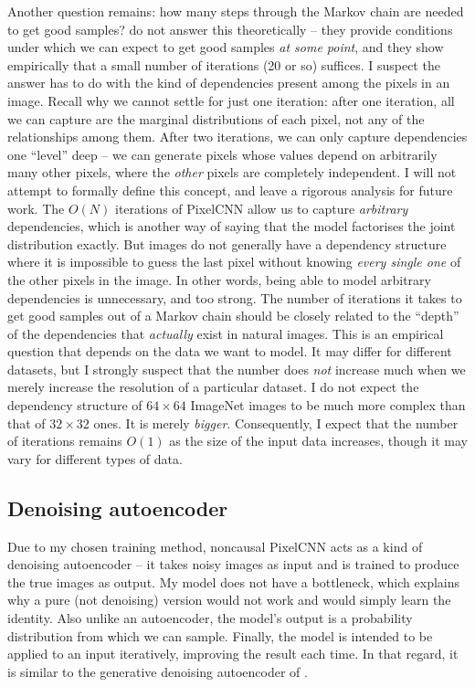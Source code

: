 \documentclass[11pt, a4paper, openany]{book}
\newcommand{\nquote}[1]{``{#1}''}
\begin{document}
Another question remains: how many steps through the Markov chain are needed to get good samples? \citet{denoisinggenerative} do not answer this theoretically -- they provide conditions under which we can expect to get good samples \emph{at some point}, and they show empirically that a small number of iterations (20 or so) suffices. I suspect the answer has to do with the kind of dependencies present among the pixels in an image. Recall why we cannot settle for just one iteration: after one iteration, all we can capture are the marginal distributions of each pixel, not any of the relationships among them. After two iterations, we can only capture dependencies one \nquote{level} deep -- we can generate pixels whose values depend on arbitrarily many other pixels, where the \emph{other} pixels are completely independent. I will not attempt to formally define this concept, and leave a rigorous analysis for future work. The $O(N)$ iterations of PixelCNN allow us to capture \emph{arbitrary} dependencies, which is another way of saying that the model factorises the joint distribution exactly. But images do not generally have a dependency structure where it is impossible to guess the last pixel without knowing \emph{every single one} of the other pixels in the image. In other words, being able to model arbitrary dependencies is unnecessary, and too strong. The number of iterations it takes to get good samples out of a Markov chain should be closely related to the \nquote{depth} of the dependencies that \emph{actually} exist in natural images. This is an empirical question that depends on the data we want to model. It may differ for different datasets, but I strongly suspect that the number does \emph{not} increase much when we merely increase the resolution of a particular dataset. I do not expect the dependency structure of $64\times 64$ ImageNet images to be much more complex than that of $32 \times 32$ ones. It is merely \emph{bigger}. Consequently, I expect that the number of iterations remains $O(1)$ as the size of the input data increases, though it may vary for different types of data.

\subsection{Denoising autoencoder}

Due to my chosen training method, noncausal PixelCNN acts as a kind of denoising autoencoder \citep{denoisingautoencoder, stackeddenoising} -- it takes noisy images as input and is trained to produce the true images as output. My model does not have a bottleneck, which explains why a pure (not denoising) version would not work and would simply learn the identity. Also unlike an autoencoder, the model's output is a probability distribution from which we can sample. Finally, the model is intended to be applied to an input iteratively, improving the result each time. In that regard, it is similar to the generative denoising autoencoder of \citet{denoisinggenerative}.
\end{document}
